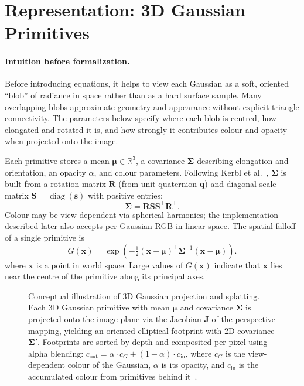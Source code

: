\section{Representation: 3D Gaussian Primitives}
\label{sec:3dgs_representation}

\paragraph{Intuition before formalization.}
Before introducing equations, it helps to view each Gaussian as a soft, oriented
``blob'' of radiance in space rather than as a hard surface sample. Many overlapping
blobs approximate geometry and appearance without explicit triangle connectivity. The
parameters below specify where each blob is centred, how elongated and rotated it is,
and how strongly it contributes colour and opacity when projected onto the image.

Each primitive stores a mean $\boldsymbol{\mu} \in \mathbb{R}^3$, a covariance
$\boldsymbol{\Sigma}$ describing elongation and orientation, an opacity $\alpha$, and
colour parameters. Following Kerbl et al.~\cite{kerbl20233dgs}, $\boldsymbol{\Sigma}$ is
built from a rotation matrix $\mathbf{R}$ (from unit quaternion $\mathbf{q}$) and
diagonal scale matrix $\mathbf{S}=\operatorname{diag}(\mathbf{s})$ with positive
entries:
\begin{equation}
\boldsymbol{\Sigma} = \mathbf{R}\mathbf{S}\mathbf{S}^\top\mathbf{R}^\top .
\label{eq:3dgs_covariance}
\end{equation}
Colour may be view-dependent via spherical harmonics; the implementation described
later also accepts per-Gaussian RGB in linear space. The spatial falloff of a single
primitive is
\begin{equation}
G(\mathbf{x}) = \exp\!\left(-\tfrac{1}{2}(\mathbf{x}-\boldsymbol{\mu})^\top
\boldsymbol{\Sigma}^{-1} (\mathbf{x}-\boldsymbol{\mu})\right).
\label{eq:3dgs_gaussian}
\end{equation}
where $\mathbf{x}$ is a point in world space. Large values of $G(\mathbf{x})$ indicate
that $\mathbf{x}$ lies near the centre of the primitive along its principal axes.

\begin{figure}[H]
\centering

\caption{Conceptual illustration of 3D Gaussian projection and splatting. Each 3D
Gaussian primitive with mean $\boldsymbol{\mu}$ and covariance $\boldsymbol{\Sigma}$ is
projected onto the image plane via the Jacobian $\mathbf{J}$ of the perspective mapping,
yielding an oriented elliptical footprint with 2D covariance $\boldsymbol{\Sigma}'$.
Footprints are sorted by depth and composited per pixel using alpha blending:
$c_{\mathrm{out}} = \alpha \cdot c_G + (1-\alpha)\cdot c_{\mathrm{in}}$, where $c_G$
is the view-dependent colour of the Gaussian, $\alpha$ is its opacity, and
$c_{\mathrm{in}}$ is the accumulated colour from primitives behind it~\cite{kerbl20233dgs}.}
\label{fig:gaussian_project}
\end{figure}

